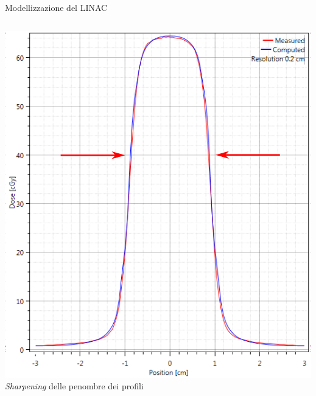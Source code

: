 \documentclass{beamer}
\begin{document}
\begin{frame}[t]{Modellizzazione del LINAC}
\begin{columns}[t]
\includegraphics[width=\textwidth]{./img/profile_model2.PNG}\\ \vspace{.2cm}
\footnotesize
\alert{\textit{Sharpening} delle penombre dei profili}
\end{columns}
\end{frame}




\end{document}
